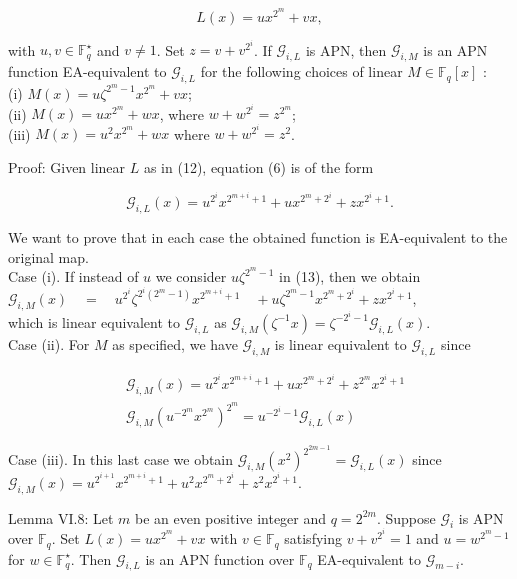 \documentclass[10pt]{article}
\begin{document}
\begin{equation*}
L(x)=u x^{2^{m}}+v x, \tag{12}
\end{equation*}


with $u, v \in \mathbb{F}_{q}^{\star}$ and $v \neq 1$. Set $z=v+v^{2^{i}}$. If $\mathcal{G}_{i, L}$ is APN, then $\mathcal{G}_{i, M}$ is an APN function EA-equivalent to $\mathcal{G}_{i, L}$ for the following choices of linear $M \in \mathbb{F}_{q}[x]$ :\\
(i) $M(x)=u \zeta^{2^{m}-1} x^{2^{m}}+v x$;\\
(ii) $M(x)=u x^{2^{m}}+w x$, where $w+w^{2^{i}}=z^{2^{m}}$;\\
(iii) $M(x)=u^{2} x^{2^{m}}+w x$ where $w+w^{2^{i}}=z^{2}$.

Proof: Given linear $L$ as in (12), equation (6) is of the form


\begin{equation*}
\mathcal{G}_{i, L}(x)=u^{2^{i}} x^{2^{m+i}+1}+u x^{2^{m}+2^{i}}+z x^{2^{i}+1} . \tag{13}
\end{equation*}


We want to prove that in each case the obtained function is EA-equivalent to the original map.\\
Case (i). If instead of $u$ we consider $u \zeta^{2^{m}-1}$ in (13), then we obtain\\
$\mathcal{G}_{i, M}(x) \quad=\quad u^{2^{i}} \zeta^{2^{i}\left(2^{m}-1\right)} x^{2^{m+i}+1} \quad+ u \zeta^{2^{m}-1} x^{2^{m}+2^{i}}+z x^{2^{i}+1}$,\\
which is linear equivalent to $\mathcal{G}_{i, L}$ as $\mathcal{G}_{i, M}\left(\zeta^{-1} x\right)=\zeta^{-2^{i}-1} \mathcal{G}_{i, L}(x)$.\\
Case (ii). For $M$ as specified, we have $\mathcal{G}_{i, M}$ is linear equivalent to $\mathcal{G}_{i, L}$ since

$$
\begin{aligned}
& \mathcal{G}_{i, M}(x)=u^{2^{i}} x^{2^{m+i}+1}+u x^{2^{m}+2^{i}}+z^{2^{m}} x^{2^{i}+1} \\
& \mathcal{G}_{i, M}\left(u^{-2^{m}} x^{2^{m}}\right)^{2^{m}}=u^{-2^{i}-1} \mathcal{G}_{i, L}(x)
\end{aligned}
$$

Case (iii). In this last case we obtain $\mathcal{G}_{i, M}\left(x^{2}\right)^{2^{2 m-1}}= \mathcal{G}_{i, L}(x)$ since\\
$\mathcal{G}_{i, M}(x)=u^{2^{i+1}} x^{2^{m+i}+1}+u^{2} x^{2^{m}+2^{i}}+z^{2} x^{2^{i}+1}$.

Lemma VI.8: Let $m$ be an even positive integer and $q= 2^{2 m}$. Suppose $\mathcal{G}_{i}$ is APN over $\mathbb{F}_{q}$. Set $L(x)=u x^{2^{m}}+v x$ with $v \in \mathbb{F}_{q}$ satisfying $v+v^{2^{i}}=1$ and $u=w^{2^{m}-1}$ for $w \in \mathbb{F}_{q}^{\star}$. Then $\mathcal{G}_{i, L}$ is an APN function over $\mathbb{F}_{q}$ EA-equivalent to $\mathcal{G}_{m-i}$.
\end{document}
